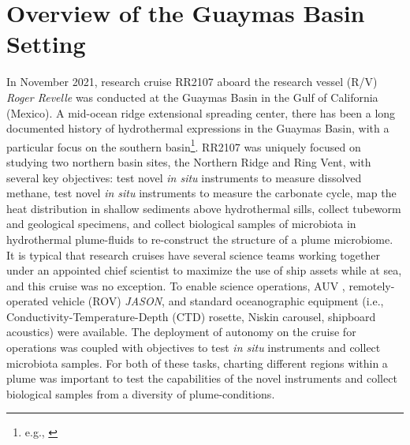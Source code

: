 \section{Overview of the Guaymas Basin Setting}
\label{sec:field_description}
In November 2021, research cruise RR2107 aboard the research vessel (R/V) \emph{Roger Revelle} was conducted at the Guaymas Basin in the Gulf of California (Mexico). A mid-ocean ridge extensional spreading center, there has been a long documented history of hydrothermal expressions in the Guaymas Basin, with a particular focus on the southern basin\footnote{e.g., \autocite{ondreas2018recent, teske2016guaymas, seewald1994variations, von1985chemistry, lonsdale1985hydrothermal}}. RR2107 was uniquely focused on studying two northern basin sites, the Northern Ridge and Ring Vent, with several key objectives: test novel \emph{in situ} instruments to measure dissolved methane\autocite{kapit2021dissolved,kapit2021measurement,michel2022gas}, test novel \emph{in situ} instruments to measure the carbonate cycle, map the heat distribution in shallow sediments above hydrothermal sills, collect tubeworm and geological specimens, and collect biological samples of microbiota in hydrothermal plume-fluids to re-construct the structure of a plume microbiome. It is typical that research cruises have several science teams working together under an appointed chief scientist to maximize the use of ship assets while at sea, and this cruise was no exception. To enable science operations, AUV \Sentry, remotely-operated vehicle (ROV) \emph{JASON}, and standard oceanographic equipment (i.e., Conductivity-Temperature-Depth (CTD) rosette, Niskin carousel, shipboard acoustics) were available. The deployment of autonomy on the cruise for \Sentry operations was coupled with objectives to test \emph{in situ} instruments and collect microbiota samples. For both of these tasks, charting different regions within a plume was important to test the capabilities of the novel instruments and collect biological samples from a diversity of plume-conditions.


